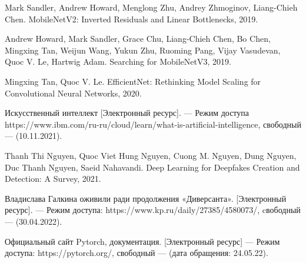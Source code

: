 \begin{thebibliography}{0}
	Mark Sandler, Andrew Howard, Menglong Zhu, Andrey Zhmoginov, Liang-Chieh Chen. MobileNetV2: Inverted Residuals and Linear Bottlenecks, 2019.
	
	Andrew Howard, Mark Sandler, Grace Chu, Liang-Chieh Chen, Bo Chen, Mingxing Tan,
	Weijun Wang, Yukun Zhu, Ruoming Pang, Vijay Vasudevan, Quoc V. Le, Hartwig Adam. Searching for MobileNetV3, 2019.
	
	Mingxing Tan, Quoc V. Le. EfficientNet: Rethinking Model Scaling for Convolutional Neural Networks, 2020.
	
	Искусственный интеллект [Электронный ресурс]. — Режим доступа https://www.ibm.com/ru-ru/cloud/learn/what-is-artificial-intelligence, свободный — (10.11.2021).
	
	Thanh Thi Nguyen, Quoc Viet Hung Nguyen, Cuong M. Nguyen, Dung Nguyen, Duc Thanh Nguyen, Saeid Nahavandi. Deep Learning for Deepfakes Creation and
	Detection: A Survey, 2021.
	
	 Владислава Галкина оживили ради продолжения «Диверсанта». [Электронный ресурс]. — Режим доступа: https://www.kp.ru/daily/27385/4580073/, cвободный — (30.04.2022).
	
	 Официальный сайт Pytorch, документация. [Электронный ресурс] — Режим доступа: https://pytorch.org/, свободный — (дата обращения: 24.05.22).
	
\end{thebibliography}
